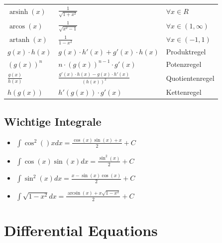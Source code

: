 \documentclass[25pt]{sciposter}
\begin{document}
\begin{multicols}{3}
{\begin{table}[]
\begin{tabular}{@{} p{} p{} p{} @{}}
			$\operatorname{arsinh}(x)$ & $\frac{1}{\sqrt{1+x^2}}$ & $\forall x \in R$\\
			$\operatorname{arcos}(x)$ & $\frac{1}{\sqrt{x^2 - 1}}$ & $\forall x \in (1, \infty)$\\		  $\operatorname{artanh}(x)$ & $\frac{1}{1-x^2}$ & $\forall x \in (-1,1)$\\
			\midrule
			$g(x) \cdot h(x)$ & $g(x) \cdot h'(x) + g'(x) \cdot h(x)$ & Produktregel\\
			$\left(g(x)\right)^n$ & $n \cdot \left( g(x) \right)^{n-1} \cdot g'(x)$ & Potenzregel\\
			$\frac{g(x)}{h(x)}$ & $\frac{ g'(x) \cdot h(x) - g(x)\cdot h'(x)}{\left(h(x)\right) ^2}$ & Quotientenregel\\
			$h(g(x))$ & $h'(g(x)) \cdot g'(x)$ & Kettenregel\\
			\bottomrule
		\end{tabular}
	\end{table}
}



\subsection*{Wichtige Integrale}

\begin{itemize}
	\item $\int \cos^2()x dx = \frac{\cos(x)\sin(x) + x}{2} + C$
	\item $\int \cos(x) \sin(x) dx = \frac{\sin^2(x)}{2}+C $
	\item $\int \sin^2(x) dx = \frac{x - \sin(x)\cos(x)}{2} + C$
	\item $\int \sqrt{1-x^2} dx = \frac{\arcsin(x) + x \sqrt{1-x^2}}{2} + C$
\end{itemize}












\section{Differential Equations}


\end{multicols}
\end{document}
